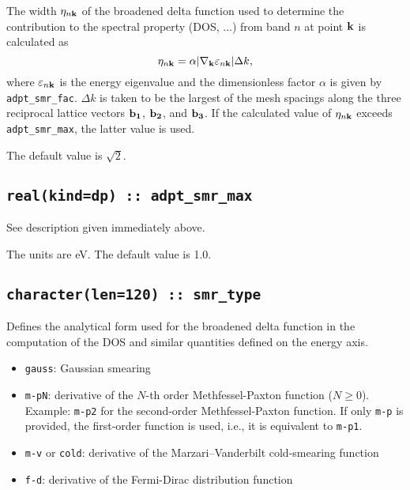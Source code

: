 The width $\eta_{n{\bf k}}$ of the broadened delta function used to
determine the contribution to the spectral property (DOS, ...) from
band $n$ at point ${\bf k}$ is calculated as
%
$$
\eta_{n{\bf k}}=\alpha\vert \nabla_{\bf k}
\varepsilon_{n{\bf k}}\vert \Delta k,
$$ 
%
where $\varepsilon_{n{\bf k}}$ is the energy eigenvalue and the
dimensionless factor $\alpha$ is given by {\tt
  adpt\_smr\_fac}. $\Delta k$ is taken to be the largest of the mesh
spacings along the three reciprocal lattice vectors ${\bf b_1}$, ${\bf
  b_2}$, and ${\bf b_3}$.  If the calculated value of $\eta_{n{\bf
    k}}$ exceeds {\tt adpt\_smr\_max}, the latter value is used.

The default value is $\sqrt{2}$.

\subsection[adpt\_smr\_max]{\tt real(kind=dp) ::
  adpt\_smr\_max}

See description given immediately above.

The units are eV. The default value is 1.0.

\subsection[smr\_type]{\tt  character(len=120) :: smr\_type}

Defines the analytical form used for the broadened delta function in
the computation of the DOS and similar quantities defined on the
energy axis.

\begin{itemize}
  
\item
  {\tt gauss}: Gaussian smearing

\item
  {\tt m-pN}: derivative of the $N$-th order
    Methfessel-Paxton function ($N\geq 0$). Example: {\tt m-p2} for the
  second-order Methfessel-Paxton function. If only {\tt m-p} is
  provided, the first-order function is used, i.e., it is equivalent to {\tt m-p1}.

\item
  {\tt m-v} or {\tt cold}: derivative of the Marzari--Vanderbilt cold-smearing function

\item
  {\tt f-d}: derivative of the Fermi-Dirac distribution function

\end{itemize}

